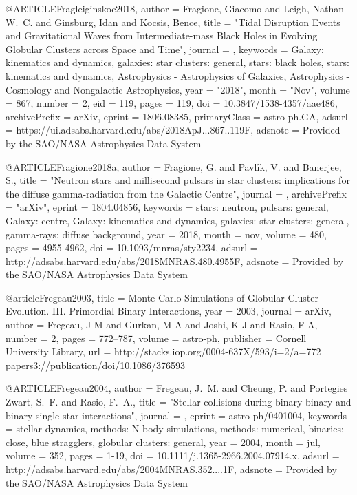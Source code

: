 \documentclass[twocolumn,tighten]{aastex63}
\begin{document}
{{{{{{@ARTICLE{Fragleiginskoc2018,
       author = {{Fragione}, Giacomo and {Leigh}, Nathan W.~C. and {Ginsburg}, Idan and
         {Kocsis}, Bence},
        title = "{Tidal Disruption Events and Gravitational Waves from Intermediate-mass Black Holes in Evolving Globular Clusters across Space and Time}",
      journal = {\apj},
     keywords = {Galaxy: kinematics and dynamics, galaxies: star clusters: general, stars: black holes, stars: kinematics and dynamics, Astrophysics - Astrophysics of Galaxies, Astrophysics - Cosmology and Nongalactic Astrophysics},
         year = "2018",
        month = "Nov",
       volume = {867},
       number = {2},
          eid = {119},
        pages = {119},
          doi = {10.3847/1538-4357/aae486},
archivePrefix = {arXiv},
       eprint = {1806.08385},
 primaryClass = {astro-ph.GA},
       adsurl = {https://ui.adsabs.harvard.edu/abs/2018ApJ...867..119F},
      adsnote = {Provided by the SAO/NASA Astrophysics Data System}
}

@ARTICLE{Fragione2018a,
   author = {{Fragione}, G. and {Pavl{\'{\i}}k}, V. and {Banerjee}, S.},
    title = "{Neutron stars and millisecond pulsars in star clusters: implications for the diffuse gamma-radiation from the Galactic Centre}",
  journal = {\mnras},
archivePrefix = "arXiv",
   eprint = {1804.04856},
 keywords = {stars: neutron, pulsars: general, Galaxy: centre, Galaxy: kinematics and dynamics, galaxies: star clusters: general, gamma-rays: diffuse background},
     year = 2018,
    month = nov,
   volume = 480,
    pages = {4955-4962},
      doi = {10.1093/mnras/sty2234},
   adsurl = {http://adsabs.harvard.edu/abs/2018MNRAS.480.4955F},
  adsnote = {Provided by the SAO/NASA Astrophysics Data System}
}

@article{Fregeau2003,
    title = {{Monte Carlo Simulations of Globular Cluster Evolution. III. Primordial Binary Interactions}},
    year = {2003},
    journal = {arXiv},
    author = {Fregeau, J M and Gurkan, M A and Joshi, K J and Rasio, F A},
    number = {2},
    pages = {772--787},
    volume = {astro-ph},
    publisher = {Cornell University Library},
    url = {http://stacks.iop.org/0004-637X/593/i=2/a=772 papers3://publication/doi/10.1086/376593}
}

@ARTICLE{Fregeau2004,
   author = {{Fregeau}, J.~M. and {Cheung}, P. and {Portegies Zwart}, S.~F. and 
	{Rasio}, F.~A.},
    title = "{Stellar collisions during binary-binary and binary-single star interactions}",
  journal = {\mnras},
   eprint = {astro-ph/0401004},
 keywords = {stellar dynamics, methods: N-body simulations, methods: numerical, binaries: close, blue stragglers, globular clusters: general},
     year = 2004,
    month = jul,
   volume = 352,
    pages = {1-19},
      doi = {10.1111/j.1365-2966.2004.07914.x},
   adsurl = {http://adsabs.harvard.edu/abs/2004MNRAS.352....1F},
  adsnote = {Provided by the SAO/NASA Astrophysics Data System}
}

}}}}}}
\end{document}

